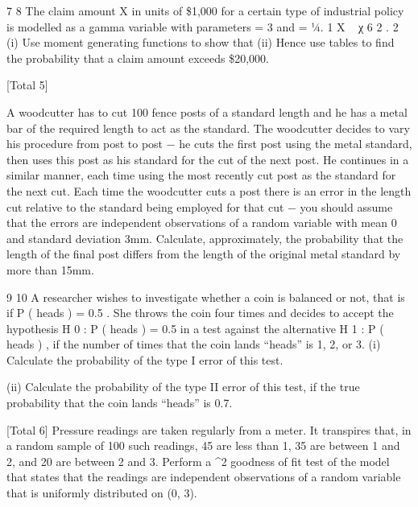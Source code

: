 \documentclass[a4paper,12pt]{article}
\begin{document}
\begin{enumerate}
7
8
The claim amount X in units of \$1,000 for a certain type of industrial policy is
modelled as a gamma variable with parameters \alpha = 3 and \lambda = 1⁄4.
1
X ~ χ 6 2 .
2
(i) Use moment generating functions to show that
(ii) Hence use tables to find the probability that a claim amount exceeds \$20,000.

[Total 5]

A woodcutter has to cut 100 fence posts of a standard length and he has a metal bar of
the required length to act as the standard. The woodcutter decides to vary his
procedure from post to post − he cuts the first post using the metal standard, then uses
this post as his standard for the cut of the next post. He continues in a similar manner,
each time using the most recently cut post as the standard for the next cut.
Each time the woodcutter cuts a post there is an error in the length cut relative to the
standard being employed for that cut − you should assume that the errors are
independent observations of a random variable with mean 0 and standard deviation
3mm.
Calculate, approximately, the probability that the length of the final post differs from
the length of the original metal standard by more than 15mm.

9
10
A researcher wishes to investigate whether a coin is balanced or not, that is if
P ( heads ) = 0.5 . She throws the coin four times and decides to accept the hypothesis
H 0 : P ( heads ) = 0.5 in a test against the alternative H 1 : P ( heads )  , if the number
of times that the coin lands “heads” is 1, 2, or 3.
(i) Calculate the probability of the type I error of this test.

(ii) Calculate the probability of the type II error of this test, if the true probability
that the coin lands “heads” is 0.7.

[Total 6]
Pressure readings are taken regularly from a meter. It transpires that, in a random
sample of 100 such readings, 45 are less than 1, 35 are between 1 and 2, and 20 are
between 2 and 3.
Perform a \chi^2 goodness of fit test of the model that states that the readings are
independent observations of a random variable that is uniformly distributed on (0, 3).


\end{enumerate}
\end{document}
